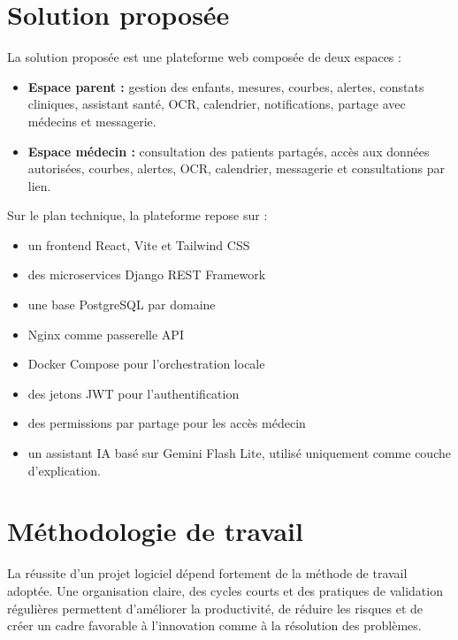 \section{Solution proposée}
\label{sec:solution-proposee}

La solution proposée est une plateforme web composée de deux espaces :

\begin{itemize}
    \item \textbf{Espace parent :} gestion des enfants, mesures, courbes, alertes, constats cliniques, assistant santé, OCR, calendrier, notifications, partage avec médecins et messagerie.
    \item \textbf{Espace médecin :} consultation des patients partagés, accès aux données autorisées, courbes, alertes, OCR, calendrier, messagerie et consultations par lien.
\end{itemize}

Sur le plan technique, la plateforme repose sur :

\begin{itemize}
    \item un frontend React, Vite et Tailwind CSS 
    \item des microservices Django REST Framework 
    \item une base PostgreSQL par domaine 
    \item Nginx comme passerelle API 
    \item Docker Compose pour l'orchestration locale 
    \item des jetons JWT pour l'authentification 
    \item des permissions par partage pour les accès médecin 
    \item un assistant IA basé sur Gemini Flash Lite, utilisé uniquement comme couche d'explication.
\end{itemize}

\section{Méthodologie de travail}
\label{sec:methodologie}

La réussite d'un projet logiciel dépend fortement de la méthode de travail
adoptée. Une organisation claire, des cycles courts et des pratiques de
validation régulières permettent d'améliorer la productivité, de réduire les
risques et de créer un cadre favorable à l'innovation comme à la résolution des
problèmes.

